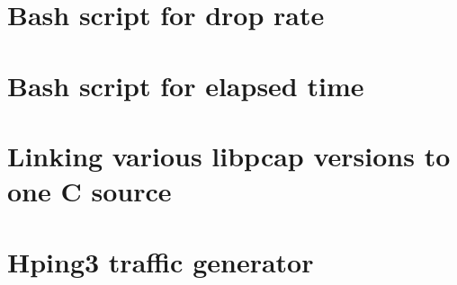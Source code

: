 \documentclass[12pt,a4paper,twoside]{report}
\begin{document}
\newpage



\begin{appendices}
	\chapter{Bash script for drop rate} \label{appendix:script:droprate}
		
	\chapter{Bash script for elapsed time} \label{appendix:script:timed}
		
	\chapter{Linking various libpcap versions to one C source} \label{appendix:compilation:pcaps}
		
	\chapter{Hping3 traffic generator} \label{appendix:hping3}
		

\end{appendices}
\end{document}
